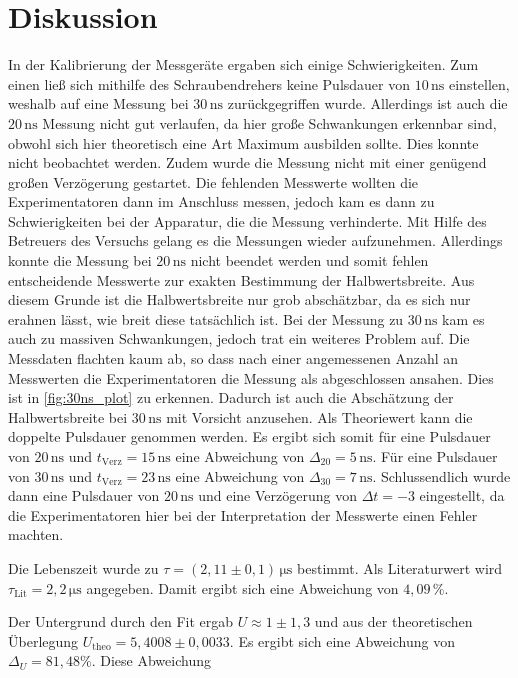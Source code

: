 \section{Diskussion}
\label{sec:Diskussion}

In der Kalibrierung der Messgeräte ergaben sich einige Schwierigkeiten.
Zum einen ließ sich mithilfe des Schraubendrehers keine Pulsdauer von $10 \, \unit{\nano\second}$ einstellen, weshalb auf eine Messung bei $30 \, \unit{\nano\second}$ zurückgegriffen wurde.
Allerdings ist auch die $20 \, \unit{\nano\second}$ Messung nicht gut verlaufen, da hier große Schwankungen erkennbar sind, obwohl sich hier theoretisch eine Art Maximum ausbilden sollte.
Dies konnte nicht beobachtet werden.
Zudem wurde die Messung nicht mit einer genügend großen Verzögerung gestartet.
Die fehlenden Messwerte wollten die Experimentatoren dann im Anschluss messen, jedoch kam es dann zu Schwierigkeiten bei der Apparatur, die die Messung verhinderte.
Mit Hilfe des Betreuers des Versuchs gelang es die Messungen wieder aufzunehmen.
Allerdings konnte die Messung bei $20 \, \unit{\nano\second}$ nicht beendet werden und somit fehlen entscheidende Messwerte zur exakten Bestimmung der Halbwertsbreite.
Aus diesem Grunde ist die Halbwertsbreite nur grob abschätzbar, da es sich nur erahnen lässt, wie breit diese tatsächlich ist.
Bei der Messung zu $30 \, \unit{\nano\second}$ kam es auch zu massiven Schwankungen, jedoch trat ein weiteres Problem auf.
Die Messdaten flachten kaum ab, so dass nach einer angemessenen Anzahl an Messwerten die Experimentatoren die Messung als abgeschlossen ansahen.
Dies ist in \autoref{fig:30ns_plot} zu erkennen.
Dadurch ist auch die Abschätzung der Halbwertsbreite bei $30 \, \unit{\nano\second}$ mit Vorsicht anzusehen.
Als Theoriewert kann die doppelte Pulsdauer genommen werden.
Es ergibt sich somit für eine Pulsdauer von $20 \, \unit{\nano\second}$ und  $t_\text{Verz} = 15 \, \unit{\nano\second}$ eine Abweichung von $\Delta_{20} = 5 \, \unit{\nano\second}$.
Für eine Pulsdauer von $30 \, \unit{\nano\second}$ und  $t_\text{Verz} = 23 \, \unit{\nano\second}$ eine Abweichung von $\Delta_{30} = 7 \, \unit{\nano\second}$.
Schlussendlich wurde dann eine Pulsdauer von $20 \, \unit{\nano\second}$ und eine Verzögerung von $\Delta t = -3$ eingestellt, da die Experimentatoren hier bei der Interpretation der Messwerte einen Fehler machten.

Die Lebenszeit wurde zu $\tau = (2{,}11\pm 0{,}1) \, \unit{\micro\second}$ bestimmt.
Als Literaturwert wird $\tau_\text{Lit} = 2{,}2 \, \unit{\micro\second}$ angegeben.
Damit ergibt sich eine Abweichung von $4{,}09 \, \% $.

Der Untergrund durch den Fit ergab $U \approx 1 \pm 1{,}3$ und aus der theoretischen Überlegung $U_\text{theo} = 5{,}4008 \pm 0{,}0033$.
Es ergibt sich eine Abweichung von $\Delta_U = 81{,}48 \% $.
Diese Abweichung 